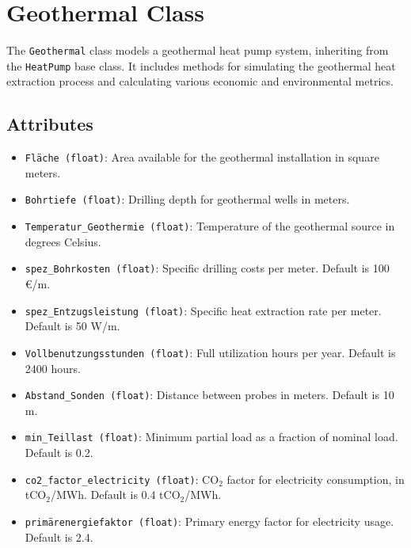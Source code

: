 \section{Geothermal Class}
The \texttt{Geothermal} class models a geothermal heat pump system, inheriting from the \texttt{HeatPump} base class. It includes methods for simulating the geothermal heat extraction process and calculating various economic and environmental metrics.

\subsection{Attributes}
\begin{itemize}
    \item \texttt{Fläche (float)}: Area available for the geothermal installation in square meters.
    \item \texttt{Bohrtiefe (float)}: Drilling depth for geothermal wells in meters.
    \item \texttt{Temperatur\_Geothermie (float)}: Temperature of the geothermal source in degrees Celsius.
    \item \texttt{spez\_Bohrkosten (float)}: Specific drilling costs per meter. Default is 100 €/m.
    \item \texttt{spez\_Entzugsleistung (float)}: Specific heat extraction rate per meter. Default is 50 W/m.
    \item \texttt{Vollbenutzungsstunden (float)}: Full utilization hours per year. Default is 2400 hours.
    \item \texttt{Abstand\_Sonden (float)}: Distance between probes in meters. Default is 10 m.
    \item \texttt{min\_Teillast (float)}: Minimum partial load as a fraction of nominal load. Default is 0.2.
    \item \texttt{co2\_factor\_electricity (float)}: CO$_2$ factor for electricity consumption, in tCO$_2$/MWh. Default is 0.4 tCO$_2$/MWh.
    \item \texttt{primärenergiefaktor (float)}: Primary energy factor for electricity usage. Default is 2.4.
\end{itemize}

